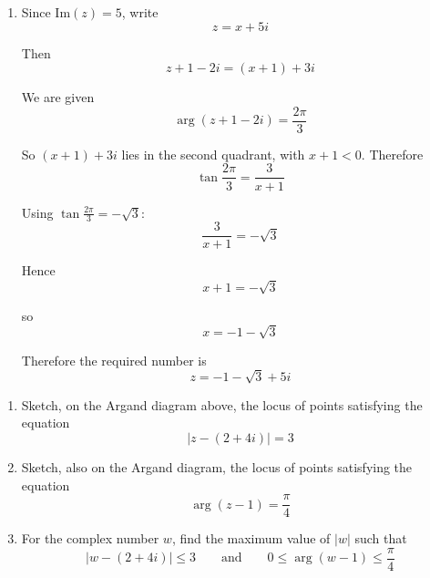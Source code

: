 \documentclass[leqno]{article}
\begin{document}
\begin{enumerate}[
  label=\textbf{\arabic*.},
  leftmargin=*,
  topsep=0pt,
  partopsep=0pt,
  parsep=0pt
]
\begin{djsSolution}
\begin{enumerate}[label=\textbf{(\alph*)}]
  \item Since \(\mathrm{Im}(z)=5\), write
\[
z=x+5i
\]

Then
\[
z+1-2i=(x+1)+3i
\]

We are given
\[
\arg(z+1-2i)=\frac{2\pi}{3}
\]

So \((x+1)+3i\) lies in the second quadrant, with \(x+1<0\). Therefore
\[
\tan\frac{2\pi}{3}=\frac{3}{x+1}
\]

Using \(\tan\frac{2\pi}{3}=-\sqrt{3}\):
\[
\frac{3}{x+1}=-\sqrt{3}
\]

Hence
\[
x+1=-\sqrt{3}
\]

so
\[
x=-1-\sqrt{3}
\]

Therefore the required number is
\[
z=-1-\sqrt{3}+5i
\]
\end{enumerate}
\end{djsSolution}


\newpage

\questionitem

\begin{figure}[H]
    \centering
{}
\end{figure}


\begin{enumerate}[label=\textbf{(\alph*)}]
  \item Sketch, on the Argand diagram above, the locus of points satisfying the equation
  \[
  |z-(2+4i)|=3
  \]
  \item Sketch, also on the Argand diagram, the locus of points satisfying the equation
  \[
  \arg(z-1)=\frac{\pi}{4}
  \]
  \item For the complex number $w$, find the maximum value of $|w|$ such that
  \[
  |w-(2+4i)|\le 3 \qquad \text{and} \qquad 0\le \arg(w-1)\le \frac{\pi}{4}
  \]
\end{enumerate}


\end{enumerate}
\end{document}
